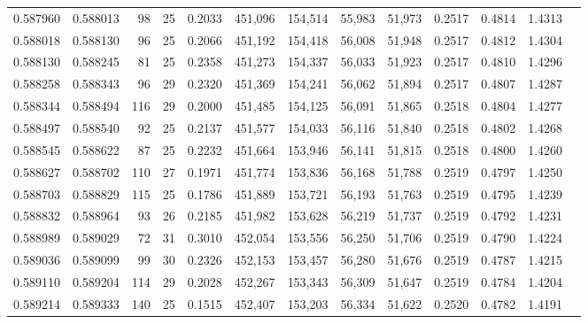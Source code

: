 \begin{tabular}{rrrrrrrrrrrrr}
0.587960 & 0.588013 &    98 &  25 &                                     0.2033 & 451,096 & 154,514 &  55,983 &  51,973 & 0.2517 & 0.4814 & 1.4313 \\
0.588018 & 0.588130 &    96 &  25 &                                     0.2066 & 451,192 & 154,418 &  56,008 &  51,948 & 0.2517 & 0.4812 & 1.4304 \\
0.588130 & 0.588245 &    81 &  25 &                                     0.2358 & 451,273 & 154,337 &  56,033 &  51,923 & 0.2517 & 0.4810 & 1.4296 \\
0.588258 & 0.588343 &    96 &  29 &                                     0.2320 & 451,369 & 154,241 &  56,062 &  51,894 & 0.2517 & 0.4807 & 1.4287 \\
0.588344 & 0.588494 &   116 &  29 &                                     0.2000 & 451,485 & 154,125 &  56,091 &  51,865 & 0.2518 & 0.4804 & 1.4277 \\
0.588497 & 0.588540 &    92 &  25 &                                     0.2137 & 451,577 & 154,033 &  56,116 &  51,840 & 0.2518 & 0.4802 & 1.4268 \\
0.588545 & 0.588622 &    87 &  25 &                                     0.2232 & 451,664 & 153,946 &  56,141 &  51,815 & 0.2518 & 0.4800 & 1.4260 \\
0.588627 & 0.588702 &   110 &  27 &                                     0.1971 & 451,774 & 153,836 &  56,168 &  51,788 & 0.2519 & 0.4797 & 1.4250 \\
0.588703 & 0.588829 &   115 &  25 &                                     0.1786 & 451,889 & 153,721 &  56,193 &  51,763 & 0.2519 & 0.4795 & 1.4239 \\
0.588832 & 0.588964 &    93 &  26 &                                     0.2185 & 451,982 & 153,628 &  56,219 &  51,737 & 0.2519 & 0.4792 & 1.4231 \\
0.588989 & 0.589029 &    72 &  31 &                                     0.3010 & 452,054 & 153,556 &  56,250 &  51,706 & 0.2519 & 0.4790 & 1.4224 \\
0.589036 & 0.589099 &    99 &  30 &                                     0.2326 & 452,153 & 153,457 &  56,280 &  51,676 & 0.2519 & 0.4787 & 1.4215 \\
0.589110 & 0.589204 &   114 &  29 &                                     0.2028 & 452,267 & 153,343 &  56,309 &  51,647 & 0.2519 & 0.4784 & 1.4204 \\
0.589214 & 0.589333 &   140 &  25 &                                     0.1515 & 452,407 & 153,203 &  56,334 &  51,622 & 0.2520 & 0.4782 & 1.4191 \\

\end{tabular}
